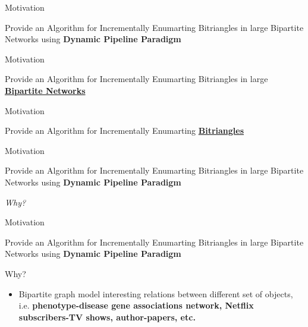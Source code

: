 \begin{frame}[fragile]{Motivation}
  \begin{center}
    Provide an Algorithm for Incrementally Enumarting Bitriangles in large Bipartite Networks using \textbf{Dynamic Pipeline Paradigm}
  \end{center}    
\end{frame}

\begin{frame}[fragile]{Motivation}
  \begin{center}
    {\color{light}Provide an Algorithm for Incrementally Enumarting Bitriangles in large} \underline{{\color{red}\textbf{Bipartite Networks}}} {}
  \end{center}    
  \begin{figure}
    \centering
  \end{figure}
\end{frame}

\begin{frame}[fragile]{Motivation}
  \begin{center}
    {\color{light}Provide an Algorithm for Incrementally Enumarting} \underline{{\color{red}\textbf{Bitriangles}}} {}
  \end{center}    
  \begin{figure}
    \centering
  \end{figure}
\end{frame}


\begin{frame}[fragile]{Motivation}
  \begin{center}
    Provide an Algorithm for Incrementally Enumarting Bitriangles in large Bipartite Networks using \textbf{Dynamic Pipeline Paradigm}
  \end{center}    
  \vspace{0.5cm}
  \begin{center}
  \huge\emph{Why?}
  \end{center}
\end{frame}

\begin{frame}[fragile]{Motivation}
  \begin{center}
    Provide an Algorithm for Incrementally Enumarting Bitriangles in large Bipartite Networks using \textbf{Dynamic Pipeline Paradigm}
  \end{center}    
  \begin{block}{Why?}
    \begin{itemize}
      \item Bipartite graph model interesting relations between different set of objects, i.e. \textbf{phenotype-disease gene associations network, Netflix subscribers-TV shows, author-papers, etc.}
    \end{itemize}
  \end{block}
\end{frame}

